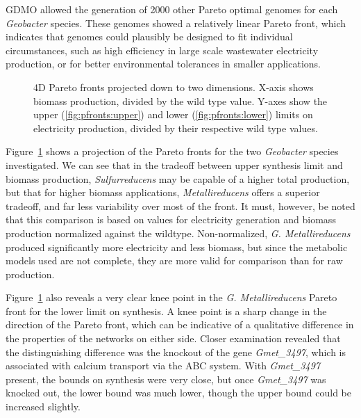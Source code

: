 \documentclass[a4paper]{article}
\begin{document}
GDMO allowed the generation of 2000 other Pareto optimal genomes for each {\it Geobacter} species. These genomes showed a relatively linear Pareto front, which indicates that genomes could plausibly be designed to fit individual circumstances, such as high efficiency in large scale wastewater electricity production, or for better environmental tolerances in smaller applications.

\begin{figure}[!htb]
	\caption{4D Pareto fronts projected down to two dimensions. X-axis shows biomass production, divided by the wild type value. Y-axes show the upper (\ref{fig:pfronts:upper}) and lower (\ref{fig:pfronts:lower}) limits on electricity production, divided by their respective wild type values. \label{fig:pfronts}}
\end{figure}

Figure~\ref{fig:pfronts} shows a projection of the Pareto fronts for the two {\it Geobacter} species investigated. We can see that in the tradeoff between upper synthesis limit and biomass production, {\it Sulfurreducens} may be capable of a higher total production, but that for higher biomass applications, {\it Metallireducens }offers a superior tradeoff, and far less variability over most of the front. It must, however, be noted that this comparison is based on values for electricity generation and biomass production normalized against the wildtype. Non-normalized, {\it G. Metallireducens} produced significantly more electricity and less biomass, but since the metabolic models used are not complete, they are more valid for comparison than for raw production.

Figure~\ref{fig:pfronts} also reveals a very clear knee point in the {\it G. Metallireducens} Pareto front for the lower limit on synthesis. A knee point is a sharp change in the direction of the Pareto front, which can be indicative of a qualitative difference in the properties of the networks on either side. Closer examination revealed that the distinguishing difference was the knockout of the gene {\it Gmet\_3497}, which is associated with calcium transport via the ABC system. With {\it Gmet\_3497} present, the bounds on synthesis were very close, but once {\it Gmet\_3497} was knocked out, the lower bound was much lower, though the upper bound could be increased slightly.
\end{document}
